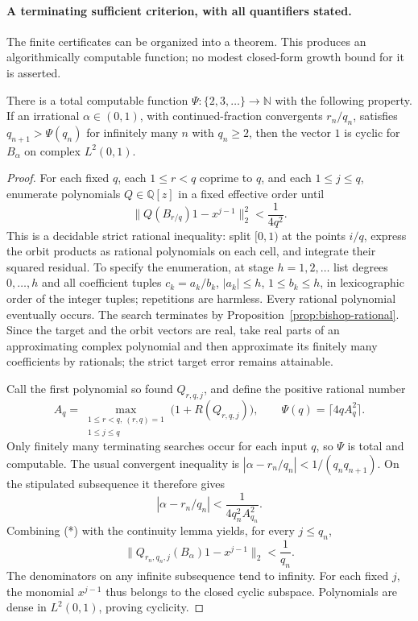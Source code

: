 \paragraph{A terminating sufficient criterion, with all quantifiers stated.}
The finite certificates can be organized into a theorem.  This produces an
algorithmically computable function; no modest closed-form growth bound for
it is asserted.

\begin{theorem}\ours{}
\label{thm:bishop-gap}
There is a total computable function \(\Psi:\{2,3,\ldots\}\to\mathbb N\)
with the following property.  If an irrational \(\alpha\in(0,1)\), with
continued-fraction convergents \(r_n/q_n\), satisfies
\(q_{n+1}>\Psi(q_n)\) for infinitely many \(n\) with \(q_n\ge2\), then
the vector \(1\) is cyclic for \(B_\alpha\) on complex \(L^2(0,1)\).
\end{theorem}
\begin{proof}
For each fixed \(q\), each \(1\le r<q\) coprime to \(q\), and each
\(1\le j\le q\), enumerate polynomials \(Q\in\mathbb Q[z]\) in a fixed
effective order until
\[
 \|Q(B_{r/q})1-x^{j-1}\|_2^2<\frac1{4q^2}.
 \tag{*}
\]
This is a decidable strict rational inequality: split \([0,1)\) at the
points \(i/q\), express the orbit products as rational polynomials on
each cell, and integrate their squared residual.  To specify the enumeration,
at stage \(h=1,2,\ldots\) list degrees \(0,\ldots,h\) and all coefficient
tuples \(c_k=a_k/b_k\), \(|a_k|\le h\), \(1\le b_k\le h\), in
lexicographic order of the integer tuples; repetitions are harmless.
Every rational polynomial eventually occurs.  The search terminates
by Proposition~\ref{prop:bishop-rational}.  Since the target and the orbit
vectors are real, take real parts of an approximating complex polynomial
and then approximate its finitely many coefficients by rationals; the
strict target error remains attainable.

Call the first polynomial so found \(Q_{r,q,j}\), and define the positive
rational number
\[
 A_q=\max_{\substack{1\le r<q,\ (r,q)=1\\1\le j\le q}}
       \bigl(1+R(Q_{r,q,j})\bigr),
 \qquad \Psi(q)=\lceil4q A_q^2\rceil.
\]
Only finitely many terminating searches occur for each input \(q\), so
\(\Psi\) is total and computable.  The usual convergent inequality is
\(|\alpha-r_n/q_n|<1/(q_nq_{n+1})\).  On the stipulated subsequence it
therefore gives
\[
 |\alpha-r_n/q_n|<\frac1{4q_n^2 A_{q_n}^2}.
\]
Combining (*) with the continuity lemma yields, for every \(j\le q_n\),
\[
 \|Q_{r_n,q_n,j}(B_\alpha)1-x^{j-1}\|_2<\frac1{q_n}.
\]
The denominators on any infinite subsequence tend to infinity.  For each
fixed \(j\), the monomial \(x^{j-1}\) thus belongs to the closed cyclic
subspace.  Polynomials are dense in \(L^2(0,1)\), proving cyclicity.
\end{proof}

